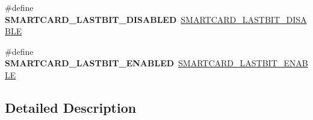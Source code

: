 \begin{DoxyCompactItemize}
\#define {\bfseries S\+M\+A\+R\+T\+C\+A\+R\+D\+\_\+\+L\+A\+S\+T\+B\+I\+T\+\_\+\+D\+I\+S\+A\+B\+L\+ED}~\hyperlink{group___s_m_a_r_t_c_a_r_d___last___bit_ga8ce0dd5ed70e0ce9799c9b056363e884}{S\+M\+A\+R\+T\+C\+A\+R\+D\+\_\+\+L\+A\+S\+T\+B\+I\+T\+\_\+\+D\+I\+S\+A\+B\+LE}
\item 
\mbox{\label{group___h_a_l___s_m_a_r_t_c_a_r_d___aliased___defines_ga8855da1a5c89e98586045ec22bdedb29}} 
\#define {\bfseries S\+M\+A\+R\+T\+C\+A\+R\+D\+\_\+\+L\+A\+S\+T\+B\+I\+T\+\_\+\+E\+N\+A\+B\+L\+ED}~\hyperlink{group___s_m_a_r_t_c_a_r_d___last___bit_ga11edb8d6ed3ba95eade9a1a6d35a2468}{S\+M\+A\+R\+T\+C\+A\+R\+D\+\_\+\+L\+A\+S\+T\+B\+I\+T\+\_\+\+E\+N\+A\+B\+LE}
\end{DoxyCompactItemize}


\subsection{Detailed Description}

